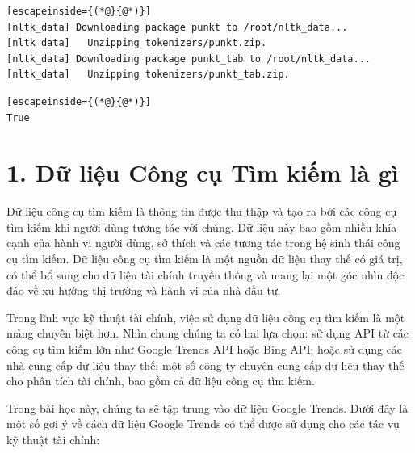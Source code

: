 \begin{lstlisting}[escapeinside={(*@}{@*)}]
[nltk_data] Downloading package punkt to /root/nltk_data...
[nltk_data]   Unzipping tokenizers/punkt.zip.
[nltk_data] Downloading package punkt_tab to /root/nltk_data...
[nltk_data]   Unzipping tokenizers/punkt_tab.zip.
\end{lstlisting}

\begin{lstlisting}[escapeinside={(*@}{@*)}]
True
\end{lstlisting}

\section*{1. Dữ liệu Công cụ Tìm kiếm là gì}

Dữ liệu công cụ tìm kiếm là thông tin được thu thập và tạo ra bởi các công cụ tìm kiếm khi người dùng tương tác với chúng. Dữ liệu này bao gồm nhiều khía cạnh của hành vi người dùng, sở thích và các tương tác trong hệ sinh thái công cụ tìm kiếm. Dữ liệu công cụ tìm kiếm là một nguồn dữ liệu thay thế có giá trị, có thể bổ sung cho dữ liệu tài chính truyền thống và mang lại một góc nhìn độc đáo về xu hướng thị trường và hành vi của nhà đầu tư.

Trong lĩnh vực kỹ thuật tài chính, việc sử dụng dữ liệu công cụ tìm kiếm là một mảng chuyên biệt hơn. Nhìn chung chúng ta có hai lựa chọn: sử dụng API từ các công cụ tìm kiếm lớn như Google Trends API hoặc Bing API; hoặc sử dụng các nhà cung cấp dữ liệu thay thế: một số công ty chuyên cung cấp dữ liệu thay thế cho phân tích tài chính, bao gồm cả dữ liệu công cụ tìm kiếm.

Trong bài học này, chúng ta sẽ tập trung vào dữ liệu Google Trends. Dưới đây là một số gợi ý về cách dữ liệu Google Trends có thể được sử dụng cho các tác vụ kỹ thuật tài chính:

